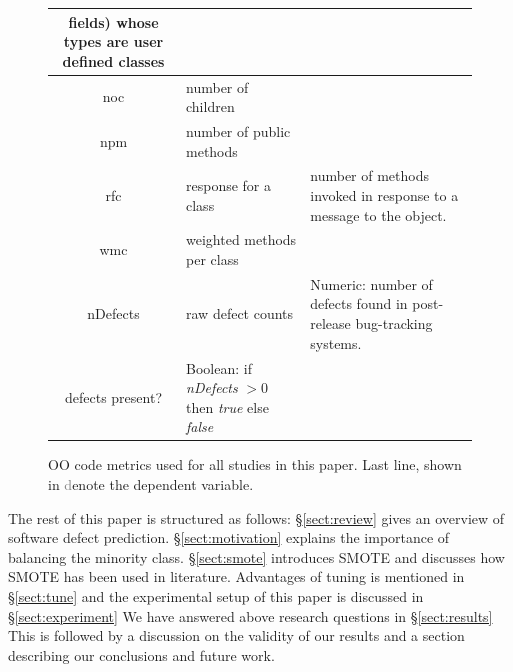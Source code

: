 \documentclass[sigconf,review, anonymous]{acmart}
\theoremstyle{break}
\theoremstyle{break}
\newcommand{\tion}[1]{{\S}\ref{sect:#1}}
\begin{document}
\begin{figure}[t!]
\begin{center}
{\begin{tabular}{c|l|p{4.0in}}
fields) whose types are user defined classes\\
\hline
noc & number of children &\\
\hline
npm & number of public methods & \\
\hline
rfc & response for a class &number of methods invoked in response to
a message to the object.\\
\hline
wmc & weighted methods per class &\\
\hline
\rowcolor{lightgray}
nDefects & raw defect counts & Numeric: number of defects found in post-release bug-tracking systems.\\
\rowcolor{lightgray}
defects present? & Boolean: if {\em nDefects} $>0$ then {\em true} else {\em false}
\end{tabular}
}
\end{center}
\caption{OO code metrics used for all studies in this paper.
Last line, shown in \textcolor{gray} denote the dependent variable.}
\label{fig:ck}
\end{figure}



The rest of this paper is structured as follows:
\tion{review} gives an overview of software defect prediction. \tion{motivation} explains the importance of balancing the minority class.
\tion{smote} introduces SMOTE and discusses how SMOTE has been used in literature. Advantages
of tuning is mentioned in \tion{tune}
and the experimental setup of this paper is discussed in \tion{experiment}
We have answered above research questions in
\tion{results} This is followed by a discussion on the validity of our results 
and a section describing our conclusions and future work.


 


\end{document}
